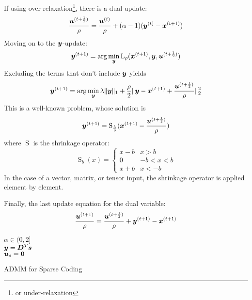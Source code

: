 If using over-relaxation\footnote{or under-relaxation}, there is a dual update:
\begin{equation}
\frac{\bm{u}^{(t + \frac{1}{2})}}{\rho} = \frac{\bm{u}^{(t)}}{\rho} + (\alpha - 1)(\bm{y}^{(t)} - \bm{x}^{(t + 1)})
\end{equation}
%
Moving on to the $\bm{y}$-update:
\begin{equation}
\bm{y}^{(t + 1)} = \arg\min_{\bm{y}} \operatorname{L}_{\rho}(\bm{x}^{(t + 1)},\bm{y},\bm{u}^{(t + \frac{1}{2})})
\end{equation}
%
Excluding the terms that don't include $\bm{y}$ yields
\begin{equation}
\bm{y}^{(t + 1)} = \arg\min_{\bm{y}} \lambda\|\bm{y}\|_1 + \frac{\rho}{2}\|\bm{y} - \bm{x}^{(t + 1)} + \frac{\bm{u}^{(t + \frac{1}{2})}}{\rho}\|_2^2
\end{equation}
%
This is a well-known problem, whose solution is
\begin{equation}
\bm{y}^{(t + 1)} = \operatorname{S}_{\frac{\lambda}{\rho}}(\bm{x}^{(t + 1)} - \frac{\bm{u}^{(t + \frac{1}{2})}}{\rho})
\end{equation}
where $\operatorname{S}$ is the shrinkage operator:
\begin{equation}
\operatorname{S}_{b}(x) = \begin{cases} x - b & x > b \\ 0 & -b < x < b \\ x + b & x < - b \end{cases}
\end{equation}
In the case of a vector, matrix, or tensor input, the shrinkage operator is applied element by element.

Finally, the last update equation for the dual variable:
\begin{equation}
\frac{\bm{u}^{(t + 1)}}{\rho} = \frac{\bm{u}^{(t + \frac{1}{2})}}{\rho} + \bm{y}^{(t + 1)} - \bm{x}^{(t + 1)}
\end{equation}

\begin{algorithm}[H]
\SetAlgoLined
   $\alpha \in (0,2]$ \\
   $\bm{y} = \bm{D}^T\bm{s}$ \\
   $\bm{u}_s = \bm{0}$ \\
 \caption{ADMM for Sparse Coding}
\end{algorithm}

